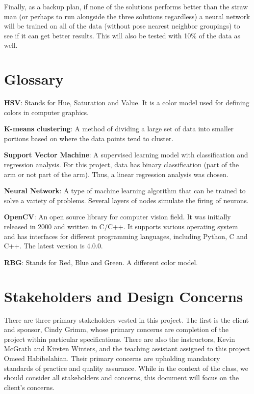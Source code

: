 \documentclass[10pt,journal,compsoc, draftclsnofoot,onecolumn]{IEEEtran}
\begin{document}
Finally, as a backup plan, if none of the solutions performs better than the straw man (or perhaps to run alongside the three solutions regardless) a neural network will be trained on all of the data (without pose nearest neighbor groupings) to see if it can get better results.
This will also be tested with 10\% of the data as well.

\section{Glossary}
\textbf{HSV}: Stands for Hue, Saturation and Value. It is a color model used for defining colors in computer graphics.

\textbf{K-means clustering}: A method of dividing a large set of data into smaller portions based on where the data points tend to cluster.

\textbf{Support Vector Machine}: A supervised learning model with classification and regression analysis.
For this project, data has binary classification (part of the arm or not part of the arm).
Thus, a linear regression analysis was chosen.

\textbf{Neural Network}: A type of machine learning algorithm that can be trained to solve a variety of problems. Several layers of nodes simulate the firing of neurons.

\textbf{OpenCV}: An open source library for computer vision field.
It was initially released in 2000 and written in C/C++.
It supports various operating system and has interfaces for different programming languages, including Python, C and C++. The latest version is 4.0.0.

\textbf{RBG}: Stands for Red, Blue and Green. A different color model.

\section{Stakeholders and Design Concerns}
There are three primary stakeholders vested in this project.
The first is the client and sponsor, Cindy Grimm, whose primary concerns are completion of the project within particular specifications.
There are also the instructors, Kevin McGrath and Kirsten Winters, and the teaching assistant assigned to this project Omeed Habibelahian.
Their primary concerns are upholding mandatory standards of practice and quality assurance.
While in the context of the class, we should consider all stakeholders and concerns, this document will focus on the client's concerns.
\end{document}
